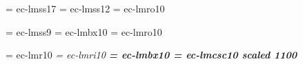 

\font\hf = ec-lmss17
\font\hhf = ec-lmss12
\font\hhhf = ec-lmro10

\font\jdf = ec-lmss9
\font\jtf = ec-lmbx10
\font\jpf = ec-lmro10

\font\rm = ec-lmr10 %
\font\it = ec-lmri10 %
\font\bf = ec-lmbx10 %
\font\sc = ec-lmcsc10 scaled 1100
\rm

\long{}
\def\ssect#1{\smallskip \goodbreak {{\parindent=0pt \jdf #1}\par}}


\def\job#1#2#3{\smallskip \goodbreak {\parindent=0pt \halign to \hsize{\jtf##\hfil&, \jpf##\hfil\tabskip=0pt plus 1 fil&\tabskip=0pt\hfil\jdf##\cr#2&#3&#1\cr}}\par}


\def\leaderfill#1{\leaders\hbox to 1em{\hss{#1}\hss}\hfill}
\def\mh{\hang}

